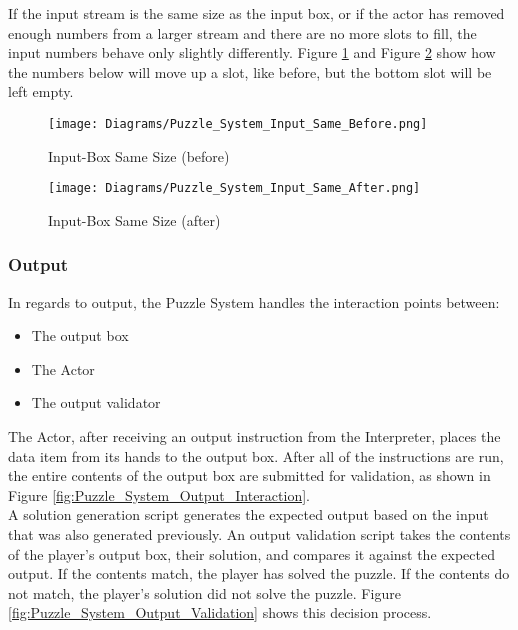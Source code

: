 If the input stream is the same size as the input box, or if the actor has removed
enough numbers from a larger stream and there are no more slots to fill, the input numbers
behave only slightly differently. Figure \ref{fig:Puzzle_System_Input_Same_Before}
and Figure \ref{fig:Puzzle_System_Input_Same_After} show how the numbers below will move up a slot, like before,
but the bottom slot will be left empty.\\

\begin{figure}[!htb]
  \caption{Input-Box Same Size (before)}
  \label{fig:Puzzle_System_Input_Same_Before}
  \centering
  \texttt{[image: Diagrams/Puzzle\_System\_Input\_Same\_Before.png]}
\end{figure}

\begin{figure}[!htb]
  \caption{Input-Box Same Size (after)}
  \label{fig:Puzzle_System_Input_Same_After}
  \centering
  \texttt{[image: Diagrams/Puzzle\_System\_Input\_Same\_After.png]}
\end{figure}
\vfill
\clearpage

\subsubsection{Output}
In regards to output, the Puzzle System handles the interaction points between:
\begin{itemize}
  \item The output box
  \item The Actor
  \item The output validator
\end{itemize}
The Actor, after receiving an output instruction from the Interpreter, places the
data item from its hands to the output box. After all of the instructions are run, the
entire contents of the output box are submitted for validation, as shown in Figure
\ref{fig:Puzzle_System_Output_Interaction}.\\

A solution generation script generates the expected output based on the input that
was also generated previously. An output validation script takes the contents of
the player's output box, their solution, and compares it against the expected output.
If the contents match, the player has solved the puzzle. If the contents do not match,
the player's solution did not solve the puzzle. Figure \ref{fig:Puzzle_System_Output_Validation} shows this decision process.


